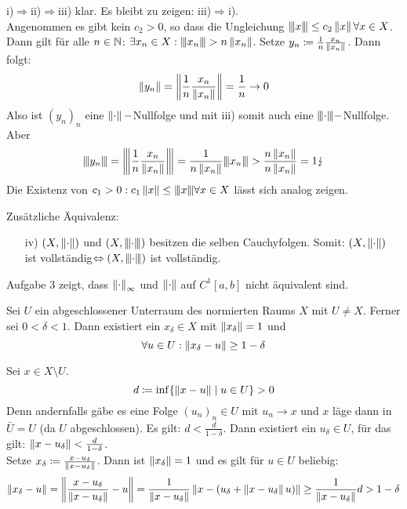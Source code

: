 \begin{beweis}
i)$ \Rightarrow $ii)$ \Rightarrow $iii) klar. Es bleibt zu zeigen: iii)$ \Rightarrow $i).\\
Angenommen es gibt kein $ c_2>0 $, so dass die Ungleichung $ \vertiii{x}\leq c_2\norm{x}\forall x\in X $. Dann gilt f\"ur alle $ n\in\N $: $ \exists x_n\in X:\vertiii{x_n}>n\norm{x_n} $. Setze $ y_n\coloneqq\frac{1}{n}\frac{x_n}{\norm{x_n}} $. Dann folgt:
\[ \norm{y_n}=\norm{\frac{1}{n}\frac{x_n}{\norm{x_n}}}=\frac{1}{n}\rightarrow 0 \]
Also ist $ (y_n)_n $ eine $ \norm{\cdot}- $Nullfolge und mit iii) somit auch eine $ \vertiii{\cdot}- $Nullfolge. Aber \[ \vertiii{y_n}=\vertiii{\frac{1}{n}\frac{x_n}{\norm{x_n}}}=\frac{1}{n\norm{x_n}}\vertiii{x_n}>\frac{n\norm{x_n}}{n\norm{x_n}}=1\lightning \]
Die Existenz von $ c_1>0:c_1\norm{x}\leq\vertiii{x} \forall x\in X$ l\"asst sich analog zeigen. 
\end{beweis}
\begin{bemerkung*}
Zus\"atzliche \"Aquivalenz:
\begin{enumerate}
\item[iv)] $ (X,\norm{\cdot}) $ und $ (X,\vertiii{\cdot}) $ besitzen die selben Cauchyfolgen. Somit: $ (X,\norm{\cdot}) $ ist vollst\"andig$ \Leftrightarrow (X,\vertiii{\cdot})$ ist vollst\"andig.
\end{enumerate}
\begin{beispiel*}
Aufgabe 3 zeigt, dass $ \norm{\cdot}_\infty $ und $ \norm{\cdot} $ auf $ C^1[a,b] $ nicht \"aquivalent sind.
\end{beispiel*}
\end{bemerkung*}
\begin{lemma}
Sei $ U $ ein abgeschlossener Unterraum des normierten Raums $ X $ mit $ U\neq X $. Ferner sei $ 0<\delta<1 $. Dann existiert ein $ x_\delta\in X $ mit $ \norm{x_\delta}=1 $ und
\[ \forall u\in U:\norm{x_\delta-u}\geq 1-\delta \]
\end{lemma}
\begin{beweis}
Sei $ x\in X\setminus U $.
\[ d\coloneqq\inf\lbrace\norm{x-u}\mid u\in U\rbrace>0 \]
Denn andernfalls g\"abe es eine Folge $ (u_n)_n\in U $ mit $ u_n\rightarrow x $ und $ x $ l\"age dann in $ \bar U=U $ (da $ U $ abgeschlossen). Es gilt: $ d<\frac{d}{1-\delta} $. Dann existiert ein $ u_\delta\in U $, f\"ur das gilt:
$ \norm{x-u_\delta}<\frac{d}{1-\delta} $.\\
Setze $ x_\delta\coloneqq\frac{x-u_\delta}{\norm{x-u_\delta}} $. Dann ist $ \norm{x_\delta}=1 $ und es gilt f\"ur $ u\in U $ beliebig:
\[ \norm{x_\delta-u}=\norm{\frac{x-u_\delta}{\norm{x-u_\delta}}-u}=\frac{1}{\norm{x-u_\delta}}\norm{x-(u_\delta+\norm{x-u_\delta}u)}\geq\frac{1}{\norm{x-u_\delta}}d>1-\delta \]
\end{beweis}
